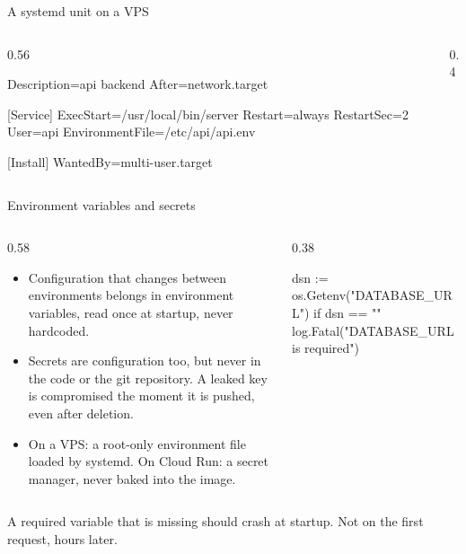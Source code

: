 \documentclass[10pt,aspectratio=169,t]{beamer}
\begin{document}
\begin{frame}[fragile,eyebrow=Deploying]{A systemd unit on a VPS}
  \begin{columns}[T]
    \begin{column}{0.56\textwidth}
\begin{codeblock}
[Unit]
Description=api backend
After=network.target

[Service]
ExecStart=/usr/local/bin/server
Restart=always
RestartSec=2
User=api
EnvironmentFile=/etc/api/api.env

[Install]
WantedBy=multi-user.target
\end{codeblock}
    \end{column}
    \begin{column}{0.4\textwidth}
    \end{column}
  \end{columns}
\end{frame}

\begin{frame}[fragile,eyebrow=Deploying]{Environment variables and secrets}
  \begin{columns}[T]
    \begin{column}{0.58\textwidth}
      \begin{itemize}
        \item Configuration that changes between environments belongs in environment variables, read once at startup, never hardcoded.
        \item Secrets are configuration too, but never in the code or the git repository. A leaked key is compromised the moment it is pushed, even after deletion.
        \item On a VPS: a root-only environment file loaded by systemd. On Cloud Run: a secret manager, never baked into the image.
      \end{itemize}
    \end{column}
    \begin{column}{0.38\textwidth}
\begin{golang}
dsn := os.Getenv("DATABASE_URL")
if dsn == "" {
    log.Fatal("DATABASE_URL is required")
}
\end{golang}
    \end{column}
  \end{columns}
  \begin{takeaway}{A required variable that is missing should crash at startup.}
    Not on the first request, hours later.
  \end{takeaway}
\end{frame}
\end{document}
